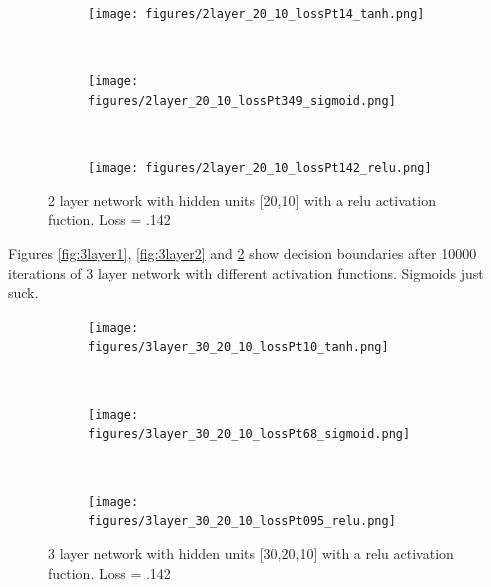 \documentclass[]{article}
\begin{document}
\begin{figure}[ht]
    \centering
    \begin{subfigure}
        \centering
        \texttt{[image: figures/2layer\_20\_10\_lossPt14\_tanh.png]}
    \end{subfigure}%
    \caption{2 layer network with hidden units [20,10] with a tanh activation fuction. Loss = .14}
 \label{fig:2layer1}
    ~ 
    \begin{subfigure}
        \centering
        \texttt{[image: figures/2layer\_20\_10\_lossPt349\_sigmoid.png]}
    \end{subfigure}
    \caption{2 layer network with hidden units [20,10] with a sigmoid activation fuction. Loss = .349}
 \label{fig:2layer2}
    ~ 
    \begin{subfigure}
        \centering
        \texttt{[image: figures/2layer\_20\_10\_lossPt142\_relu.png]}
    \end{subfigure}
    \caption{2 layer network with hidden units [20,10] with a relu activation fuction. Loss = .142}
 \label{fig:2layer3}
\end{figure}

Figures \ref{fig:3layer1}, \ref{fig:3layer2} and \ref{fig:3layer3} show decision boundaries after 10000 iterations of 3 layer network with different activation functions. Sigmoids just suck.

\begin{figure}[ht]
    \centering
    \begin{subfigure}
        \centering
        \texttt{[image: figures/3layer\_30\_20\_10\_lossPt10\_tanh.png]}
    \end{subfigure}%
    \caption{3 layer network with hidden units [30,20,10] with a tanh activation fuction. Loss = .14}
 \label{fig:3layer1}
    ~ 
    \begin{subfigure}
        \centering
        \texttt{[image: figures/3layer\_30\_20\_10\_lossPt68\_sigmoid.png]}
    \end{subfigure}
    \caption{3 layer network with hidden units [30,20,10] with a sigmoid activation fuction. Loss = .349}
 \label{fig:3layer2}
    ~ 
    \begin{subfigure}
        \centering
        \texttt{[image: figures/3layer\_30\_20\_10\_lossPt095\_relu.png]}
    \end{subfigure}
    \caption{3 layer network with hidden units [30,20,10] with a relu activation fuction. Loss = .142}
 \label{fig:3layer3}
\end{figure}
\end{document}
